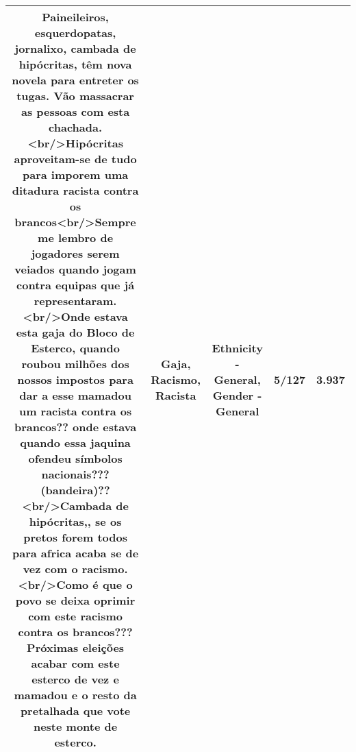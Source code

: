 \documentclass[11pt]{article}
\newlength\mylength
\begin{document}
\begin{center}
\begin{longtable}{|C{.65\mylength}|C{.30\mylength}|C{.12\mylength}|C{.12\mylength}|C{.12\mylength}|}
  \small Paineileiros, esquerdopatas, jornalixo, cambada de hipócritas, têm nova novela para entreter os tugas. Vão massacrar as pessoas com esta chachada. <br/>Hipócritas aproveitam-se de tudo para imporem uma ditadura \textbf{racista} contra os brancos<br/>Sempre me lembro de jogadores serem veiados quando jogam contra equipas que já representaram.<br/>Onde estava esta \textbf{gaja} do Bloco de Esterco, quando roubou milhões dos nossos impostos para dar a esse mamadou um \textbf{racista} contra os brancos?? onde estava quando essa jaquina ofendeu símbolos nacionais??? (bandeira)??<br/>Cambada de hipócritas,, se os pretos forem todos para africa acaba se de vez com o \textbf{racismo}.<br/>Como é que o povo se deixa oprimir com este \textbf{racismo} contra os brancos??? Próximas eleições acabar com este esterco de vez e mamadou e o resto da pretalhada que vote neste monte de esterco.\normalsize   & Gaja, Racismo, Racista & Ethnicity - General, Gender - General & 5/127 & 3.937 \\  \hline
  
\end{longtable}
\end{center}
\end{document}
